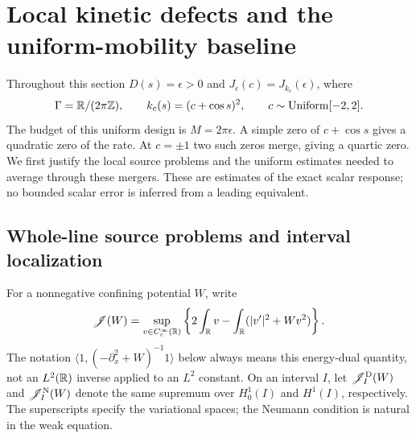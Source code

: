 \section{Local kinetic defects and the uniform-mobility baseline}
\label{sec:local-baseline}
Throughout this section $D(s)=\epsilon>0$ and
$J_\epsilon(c)=J_{k_c}(\epsilon)$, where
\begin{equation}\label{eq:cosine-ensemble}
 \Gamma=\mathbb R/(2\pi\mathbb Z),\qquad k_c(s)=(c+\cos s)^2,
 \qquad c\sim\mathrm{Uniform}[-2,2].
\end{equation}
The budget of this uniform design is $M=2\pi\epsilon$. A simple zero
of $c+\cos s$ gives a quadratic zero of the rate. At $c=\pm1$ two
such zeros merge, giving a quartic zero. We first justify the local
source problems and the uniform estimates needed to average through
these mergers. These are estimates of the exact scalar response;
no bounded scalar error is inferred from a leading equivalent.

\subsection{Whole-line source problems and interval localization}
For a nonnegative confining potential $W$, write
\begin{equation}\label{eq:line-response}
 \mathscr J(W)=\sup_{v\in C_c^\infty(\mathbb R)}
 \left\{2\int_\mathbb R v-\int_\mathbb R(|v'|^2+Wv^2)\right\}.
\end{equation}
The notation $\langle1,(-\partial_x^2+W)^{-1}1\rangle$ below always
means this energy-dual quantity, not an $L^2(\mathbb R)$ inverse applied to
an $L^2$ constant. On an interval $I$, let $\mathscr J_I^{\rm D}(W)$
and $\mathscr J_I^{\rm N}(W)$ denote the same supremum over
$H_0^1(I)$ and $H^1(I)$, respectively. The superscripts specify the
variational spaces; the Neumann condition is natural in the weak equation.

